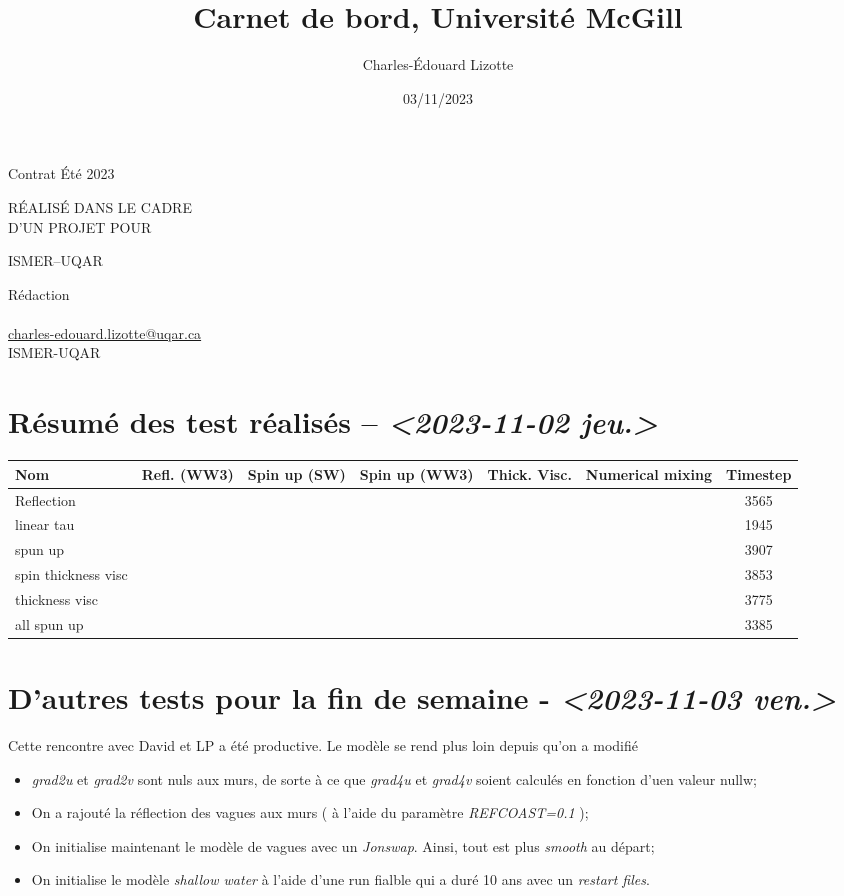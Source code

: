 \documentclass[10pt]{article}
\author{Charles-Édouard Lizotte}
\date{03/11/2023}
\title{Carnet de bord, Université McGill}
\makeatletter
\numberwithin{equation}{section}
\newcommand{\cmark}{\ding{52}}
\newcommand{\xmark}{\ding{55}}
\newcommand{\mytitlepage}{
\begin{titlepage}
\begin{center}
{\Large Contrat Été 2023 \par}
\vspace{2cm}
{\Large \MakeUppercase{\thetitle} \par}
\vspace{2cm}
RÉALISÉ DANS LE CADRE\\ D'UN PROJET POUR \par
\vspace{2cm}
{\Large ISMER--UQAR \par}
\vspace{2cm}
{\thedate}
\end{center}
\vfill
Rédaction \\
{\theauthor}\\
\url{charles-edouard.lizotte@uqar.ca}\\
ISMER-UQAR
\end{titlepage}
}
\makeatother
\begin{document}
\mytitlepage
\tableofcontents\newpage

\section{Résumé des test réalisés -- \textit{<2023-11-02 jeu.>}}
\label{sec:orgedab9bc}
\begin{center}
\begin{tabular}{lcccccc}
Nom & Refl. (WW3) & Spin up (SW) & Spin up (WW3) & Thick. Visc. & Numerical mixing & Timestep\\[0pt]
\hline
\hline
Reflection & \cmark & \xmark & \cmark & \xmark & \cmark & 3565\\[0pt]
linear tau & \xmark & \xmark & \xmark & \xmark & \cmark & 1945\\[0pt]
spun up & \xmark & \cmark & \xmark & \xmark & \cmark & 3907\\[0pt]
spin thickness visc & \xmark & \cmark & \xmark & \cmark & \xmark & 3853\\[0pt]
thickness visc & \xmark & \xmark & \xmark & \cmark & \xmark & 3775\\[0pt]
all spun up & \cmark & \cmark & \cmark & \xmark & \xmark & 3385\\[0pt]
\hline
\end{tabular}
\end{center}



\section{D'autres tests pour la fin de semaine - \textit{<2023-11-03 ven.>}}
\label{sec:org5539ee2}

Cette rencontre avec David et LP a été productive.
Le modèle se rend plus loin depuis qu'on a modifié
\begin{itemize}
\item \emph{grad2u} et \emph{grad2v} sont nuls aux murs, de sorte à ce que \emph{grad4u} et \emph{grad4v} soient calculés en fonction d'uen valeur nullw;
\item On a rajouté la réflection des vagues aux murs ( à l'aide du paramètre \emph{REFCOAST=0.1} );
\item On initialise maintenant le modèle de vagues avec un \emph{Jonswap}.
Ainsi, tout est plus \emph{smooth} au départ;
\item On initialise le modèle \emph{shallow water} à l'aide d'une run fialble qui a duré 10 ans avec un \emph{restart files}.
\end{itemize}
\end{document}
